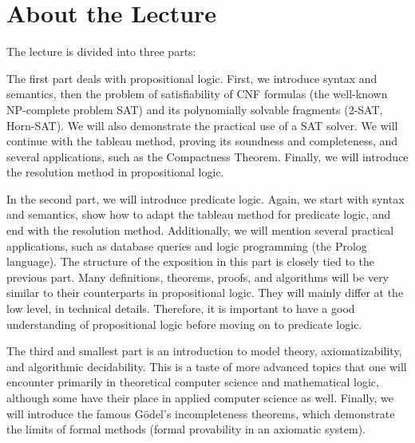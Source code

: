 \section{About the Lecture}

The lecture is divided into three parts:

The first part deals with propositional logic. First, we introduce syntax and semantics, then the problem of satisfiability of CNF formulas (the well-known NP-complete problem SAT) and its polynomially solvable fragments (2-SAT, Horn-SAT). We will also demonstrate the practical use of a SAT solver. We will continue with the tableau method, proving its soundness and completeness, and several applications, such as the Compactness Theorem. Finally, we will introduce the resolution method in propositional logic.

In the second part, we will introduce predicate logic. Again, we start with syntax and semantics, show how to adapt the tableau method for predicate logic, and end with the resolution method. Additionally, we will mention several practical applications, such as database queries and logic programming (the Prolog language). The structure of the exposition in this part is closely tied to the previous part. Many definitions, theorems, proofs, and algorithms will be very similar to their counterparts in propositional logic. They will mainly differ at the low level, in technical details. Therefore, it is important to have a good understanding of propositional logic before moving on to predicate logic.

The third and smallest part is an introduction to model theory, axiomatizability, and algorithmic decidability. This is a taste of more advanced topics that one  will encounter primarily in theoretical computer science and mathematical logic, although some have their place in applied computer science as well. Finally, we will introduce the famous Gödel's incompleteness theorems, which demonstrate the limits of formal methods (formal provability in an axiomatic system).
